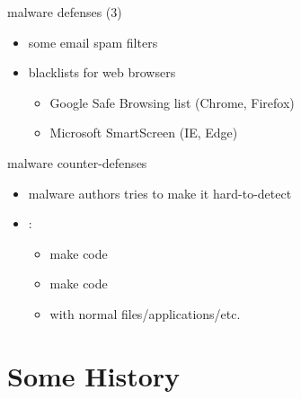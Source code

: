 \begin{frame}[plain]
\end{frame}

\begin{frame}[plain]
\end{frame}


\begin{frame}{malware defenses (3)}
    \begin{itemize}
        \item some email spam filters
        \item blacklists for web browsers
            \begin{itemize}
            \item Google Safe Browsing list (Chrome, Firefox)
            \item Microsoft SmartScreen (IE, Edge)
            \end{itemize}
    \end{itemize}
\end{frame}

\begin{frame}{malware counter-defenses}
    \begin{itemize}
    \item malware authors tries to make it hard-to-detect
    \item {}:
        \begin{itemize}
        \item make code 
        \item make code 
        \item {} with normal files/applications/etc.
        \end{itemize}
    \end{itemize}
\end{frame}

\section{Some History}

